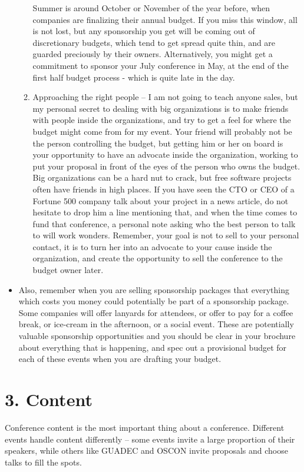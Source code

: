 \begin{itemize}
\begin{enumerate}
Summer is around October or November of the year before, when companies
are finalizing their annual budget.
If you miss this window, all is not lost, but any sponsorship you get
will be coming out of discretionary budgets, which tend to get spread
quite thin, and are guarded preciously by their owners. Alternatively,
you might get a commitment to sponsor your July conference in May, at
the end of the first half budget process - which is quite late in the day.
  \item Approaching the right people -- I am not going to teach anyone sales,
but my personal secret to dealing with big organizations is to make
friends with people inside the organizations, and try to get a feel for
where the budget might come from for my event. Your friend will probably
not be the person controlling the budget, but getting him or her on
board is your opportunity to have an advocate inside the organization,
working to put your proposal in front of the eyes of the person who owns
the budget.
Big organizations can be a hard nut to crack, but free software
projects often have friends in high places. If you have seen the CTO or
CEO of a Fortune 500 company talk about your project in a news article,
do not hesitate to drop him a line mentioning that, and when the time
comes to fund that conference, a personal note asking who the best
person to talk to will work wonders. Remember, your goal is not to sell
to your personal contact, it is to turn her into an advocate to your
cause inside the organization, and create the opportunity to sell the
conference to the budget owner later.
 \end{enumerate}
 \item Also, remember when you are selling sponsorship packages that everything
which costs you money could potentially be part of a sponsorship
package. Some companies will offer lanyards for attendees, or offer to
pay for a coffee break, or ice-cream in the afternoon, or a social
event. These are potentially valuable sponsorship opportunities and you
should be clear in your brochure about everything that is happening, and
spec out a provisional budget for each of these events when you are
drafting your budget.
\end{itemize}

\section*{3. Content}

Conference content is the most important thing about a conference.
Different events handle content differently -- some events invite a large
proportion of their speakers, while others like GUADEC and OSCON invite
proposals and choose talks to fill the spots.

